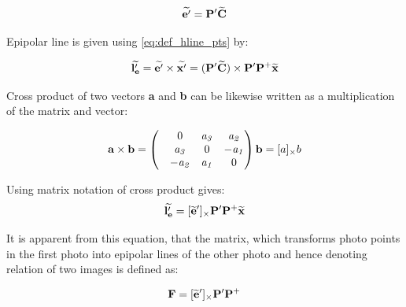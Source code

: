\documentclass[a4paper,12pt]{article}
\newcommand{\ematr}[1]{
{\bf #1}
}
\newcommand{\evect}[1]{
{\bf #1}
}
\newcommand{\ehvect}[1]{
{\bf \widetilde{#1}}
}
\newcommand{\escal}[1]{
{\it #1}
}
\begin{document}
\begin{equation}
\ehvect{e'} =  \ematr{P'}\ehvect{C} \\
\end{equation}




Epipolar line is given using \eqref{eq:def_hline_pts} by:

\begin{equation}
\ehvect{l'_{e}} =  \ehvect{e'} \times \ehvect{x'} = (\ematr{P'}\ehvect{C}) \times \ematr{P'}\ematr{P}^{+}\ehvect{x}
\end{equation}

Cross product of two vectors \evect{a} and \evect{b} can be likewise written as a multiplication of the matrix and vector:

\begin{equation}
\evect{a}  \times \evect{b}  = 
\begin{pmatrix}
   & 0      & \escal{a_{3}}   & \escal{a_{2}}\\
   & \escal{a_{3}}  & 0               & \escal{-a_{1}}\\
   & \escal{-a_{2}} & \escal{a_{1}}   & 0\\
\end{pmatrix}
\evect{b} = [a]_{\times} b
\end{equation}


Using matrix notation of cross product gives:
\begin{equation}
\ehvect{l'_{e}}  = [\ehvect{e}']_{\times} \ematr{P'}\ematr{P}^{+}\ehvect{x}
\end{equation}


It is apparent from this equation, that the matrix, which transforms photo points in the first photo into 
epipolar lines of the other photo and hence denoting relation of two images is defined as:

\begin{equation}
\ematr{F}  = [\ehvect{e}']_{\times} \ematr{P'}\ematr{P}^{+}
\end{equation}
\end{document}
